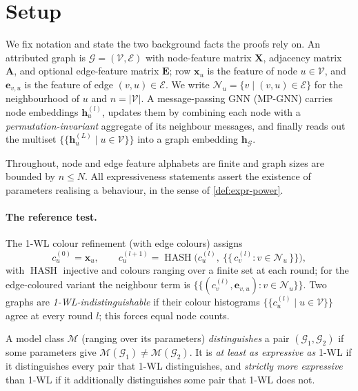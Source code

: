 \section{Setup}
\label{sec:expr-setup}

We fix notation and state the two background facts the proofs rely on. An
attributed graph is $\mathcal{G}=(\mathcal{V},\mathcal{E})$ with node-feature
matrix $\mathbf{X}$, adjacency matrix $\mathbf{A}$, and optional edge-feature
matrix $\mathbf{E}$; row $\mathbf{x}_u$ is the feature of node $u\in\mathcal{V}$,
and $\mathbf{e}_{v,u}$ is the feature of edge $(v,u)\in\mathcal{E}$. We write
$\mathcal{N}_u=\{v\mid(v,u)\in\mathcal{E}\}$ for the neighbourhood of $u$ and
$n=|\mathcal{V}|$. A message-passing GNN (MP-GNN) \citep{Gilmer2017MPNN} carries
node embeddings $\mathbf{h}_u^{(l)}$, updates them by combining each node with a
\emph{permutation-invariant} aggregate of its neighbour messages, and finally
reads out the multiset $\{\!\{\mathbf{h}_u^{(L)}\mid u\in\mathcal{V}\}\!\}$ into a
graph embedding $\mathbf{h}_{\mathcal{G}}$.

Throughout, node and edge feature alphabets are finite and graph sizes are
bounded by $n\le N$. All expressiveness statements assert the existence of
parameters realising a behaviour, in the sense of \cref{def:expr-power}.

\paragraph{The reference test.}
The 1-WL colour refinement (with edge colours) assigns
\begin{equation}
  c_u^{(0)}=\mathbf{x}_u,\qquad
  c_u^{(l+1)}=\operatorname{HASH}\!\Big(c_u^{(l)},\ \{\!\{\,c_v^{(l)}:v\in\mathcal{N}_u\,\}\!\}\Big),
  \label{eqn:expr-wl}
\end{equation}
with $\operatorname{HASH}$ injective and colours ranging over a finite set at
each round; for the edge-coloured variant the neighbour term is
$\{\!\{(c_v^{(l)},\mathbf{e}_{v,u}):v\in\mathcal{N}_u\}\!\}$. Two graphs are
\emph{1-WL-indistinguishable} if their colour histograms
$\{\!\{c_u^{(l)}\mid u\in\mathcal{V}\}\!\}$ agree at every round $l$; this forces
equal node counts.

\begin{definition}
\label{def:expr-power}
A model class $\mathcal{M}$ (ranging over its parameters) \emph{distinguishes} a
pair $(\mathcal{G}_1,\mathcal{G}_2)$ if some parameters give
$\mathcal{M}(\mathcal{G}_1)\ne\mathcal{M}(\mathcal{G}_2)$. It is \emph{at least as
expressive as} 1-WL if it distinguishes every pair that 1-WL distinguishes, and
\emph{strictly more expressive} than 1-WL if it additionally distinguishes some
pair that 1-WL does not.
\end{definition}

